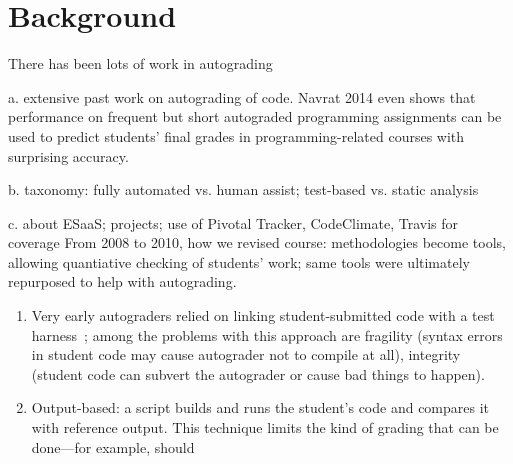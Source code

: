 \section{Background}


There has been lots of work in
autograding~\cite{ihantola-2010-autograding-survey}

a.	extensive past work on autograding of code. Navrat 2014 even shows that performance on frequent but short autograded programming assignments can be used to predict students' final grades in programming-related courses with surprising accuracy.

b.	taxonomy: fully automated vs. human assist; test-based vs. static analysis

c.	about ESaaS; projects; use of Pivotal Tracker, CodeClimate, Travis for coverage
From 2008 to 2010, how we revised course: methodologies become tools,
allowing quantiative checking of students' work; same tools were
ultimately repurposed to help with autograding.



\begin{enumerate}

\item
Very early autograders relied on linking student-submitted code with a
test harness~\cite{hollingsworth60,algol-autograders}; among the
problems with this approach are fragility (syntax errors in student code
may cause autograder not to compile at all), integrity (student code can
subvert the autograder or cause bad things to happen).

\item Output-based: a script builds and runs the student's code and
compares it with reference output.  This technique limits the kind of
grading that can be done---for example, should 

\end{enumerate}
